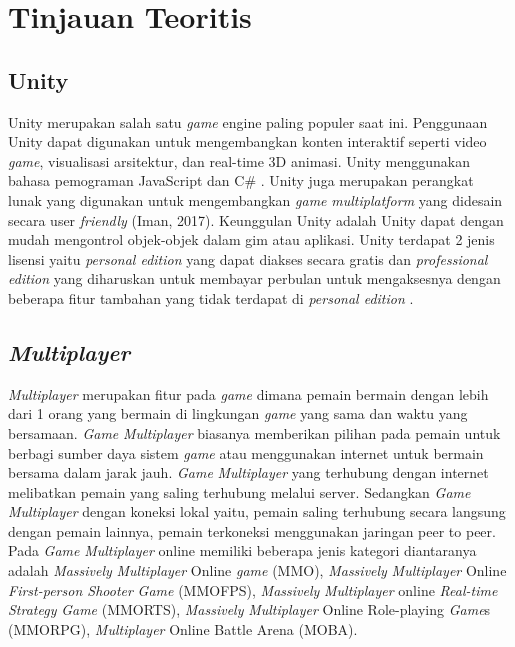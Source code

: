 \section{Tinjauan Teoritis}
\subsection{Unity}
\noindent

Unity merupakan salah satu \textit{game} engine paling populer saat ini. Penggunaan Unity dapat digunakan untuk mengembangkan konten interaktif seperti video \textit{game}, 
visualisasi arsitektur, dan real-time 3D animasi. Unity menggunakan bahasa pemograman JavaScript dan 
C\# \cite{Ansori}. Unity juga merupakan perangkat lunak yang digunakan untuk mengembangkan \textit{game} \textit{multiplatform} yang didesain secara user \textit{friendly} 
(Iman, 2017). Keunggulan Unity adalah Unity 
dapat dengan mudah mengontrol objek-objek 
dalam gim atau aplikasi. Unity terdapat 2 jenis 
lisensi yaitu \textit{personal edition} yang dapat diakses 
secara gratis dan \textit{professional edition} yang 
diharuskan untuk membayar perbulan untuk 
mengaksesnya dengan beberapa fitur tambahan 
yang tidak terdapat di \textit{personal edition} \cite{Sarwodi}. 

\subsection{\textit{Multiplayer}}
\noindent

\textit{Multiplayer} merupakan fitur pada \textit{game} dimana pemain bermain dengan lebih dari 1 orang yang bermain 
di lingkungan \textit{game} yang sama dan waktu yang bersamaan. \textit{Game} \textit{Multiplayer} biasanya memberikan pilihan pada 
pemain untuk berbagi sumber daya sistem \textit{game} atau menggunakan internet untuk bermain bersama dalam jarak 
jauh. \textit{Game} \textit{Multiplayer} yang terhubung dengan internet melibatkan pemain yang saling terhubung melalui server. 
Sedangkan \textit{Game} \textit{Multiplayer} dengan koneksi lokal yaitu, pemain saling terhubung secara langsung dengan 
pemain lainnya, pemain terkoneksi menggunakan jaringan peer to peer. Pada \textit{Game} \textit{Multiplayer} online memiliki 
beberapa jenis kategori diantaranya adalah \textit{Massively} \textit{Multiplayer} Online \textit{game} (MMO), \textit{Massively} \textit{Multiplayer} 
Online \textit{First-person Shooter} \textit{Game} (MMOFPS), \textit{Massively} \textit{Multiplayer} online \textit{Real-time Strategy} \textit{Game}
(MMORTS), \textit{Massively} \textit{Multiplayer} Online Role-playing \textit{Game}s (MMORPG), \textit{Multiplayer} Online Battle Arena
(MOBA)\cite{Ansori}. 

